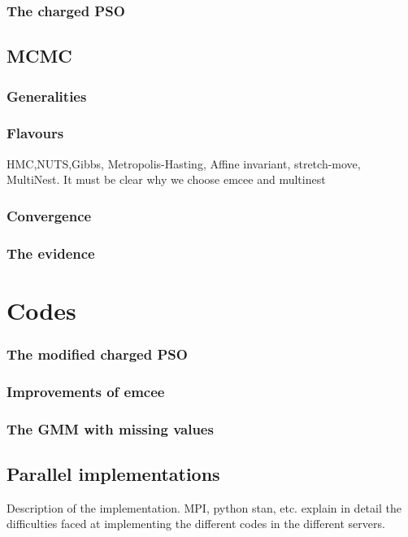 \subsubsection{The charged PSO}


\subsection{MCMC}
\subsubsection{Generalities}
\subsubsection{Flavours}
HMC,NUTS,Gibbs, Metropolis-Hasting, Affine invariant, stretch-move, MultiNest.
It must be clear why we choose emcee and multinest
\subsubsection{Convergence}
\subsubsection{The evidence}


\section{Codes}
\label{sect:code}
\subsubsection{The modified charged PSO}
\subsubsection{Improvements of emcee}
\subsubsection{The GMM with missing values}
\subsection{Parallel implementations}
Description of the implementation. MPI, python stan, etc.
explain in detail the difficulties faced at implementing the different codes in the different servers.

